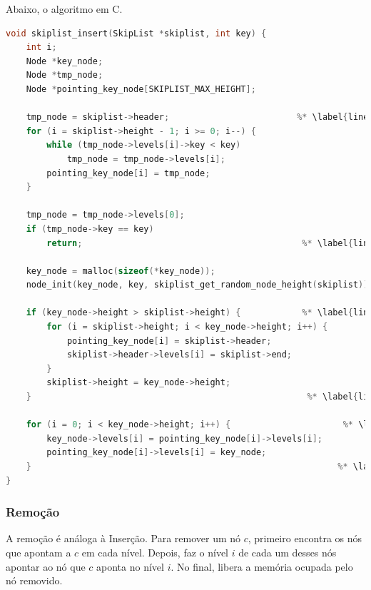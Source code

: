 \documentclass[paper=a4, fontsize=11pt]{scrartcl} %
\numberwithin{equation}{section}
\numberwithin{figure}{section}
\numberwithin{table}{section}
\numberwithin{definition}{section}
\numberwithin{theorem}{section}
\numberwithin{property}{section}
\numberwithin{proposition}{section}
\begin{document}
Abaixo, o algoritmo em C. 

\begin{lstlisting}[caption=Inserção., language=C]
void skiplist_insert(SkipList *skiplist, int key) {
    int i;
    Node *key_node;
    Node *tmp_node;
    Node *pointing_key_node[SKIPLIST_MAX_HEIGHT];

    tmp_node = skiplist->header;                         %* \label{line:ins_beg_p1} *)
    for (i = skiplist->height - 1; i >= 0; i--) {
        while (tmp_node->levels[i]->key < key)
            tmp_node = tmp_node->levels[i];
        pointing_key_node[i] = tmp_node;
    }                                                    

    tmp_node = tmp_node->levels[0];
    if (tmp_node->key == key)
        return;                                           %* \label{line:ins_end_p1} *)

    key_node = malloc(sizeof(*key_node));
    node_init(key_node, key, skiplist_get_random_node_height(skiplist));

    if (key_node->height > skiplist->height) {            %* \label{line:ins_beg_p2} *)
        for (i = skiplist->height; i < key_node->height; i++) {
            pointing_key_node[i] = skiplist->header;
            skiplist->header->levels[i] = skiplist->end;
        }
        skiplist->height = key_node->height;
    }                                                      %* \label{line:ins_end_p2} *)

    for (i = 0; i < key_node->height; i++) {                      %* \label{line:ins_beg_p3} *)
        key_node->levels[i] = pointing_key_node[i]->levels[i];
        pointing_key_node[i]->levels[i] = key_node;
    }                                                            %* \label{line:ins_end_p3} *)
}
\end{lstlisting}

\subsubsection{Remoção}

A remoção é análoga à Inserção. Para remover um nó $c$, primeiro encontra os nós que apontam a
$c$ em cada nível. Depois, faz o nível $i$ de cada um desses nós apontar ao nó que $c$ aponta no nível $i$.
No final, libera a memória ocupada pelo nó removido.
\end{document}
